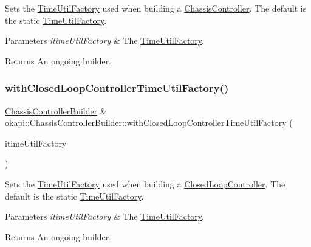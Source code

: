 Sets the \mbox{\hyperlink{classokapi_1_1TimeUtilFactory}{Time\+Util\+Factory}} used when building a \mbox{\hyperlink{classokapi_1_1ChassisController}{Chassis\+Controller}}. The default is the static \mbox{\hyperlink{classokapi_1_1TimeUtilFactory}{Time\+Util\+Factory}}.


\begin{DoxyParams}{Parameters}
{\em itime\+Util\+Factory} & The \mbox{\hyperlink{classokapi_1_1TimeUtilFactory}{Time\+Util\+Factory}}. \\
\hline
\end{DoxyParams}
\begin{DoxyReturn}{Returns}
An ongoing builder. 
\end{DoxyReturn}
\mbox{\label{classokapi_1_1ChassisControllerBuilder_a5bf13424f9357099d6e4d336cc0cec98}} 
\subsubsection{\texorpdfstring{withClosedLoopControllerTimeUtilFactory()}{withClosedLoopControllerTimeUtilFactory()}}
{\footnotesize\ttfamily \mbox{\hyperlink{classokapi_1_1ChassisControllerBuilder}{Chassis\+Controller\+Builder}} \& okapi\+::\+Chassis\+Controller\+Builder\+::with\+Closed\+Loop\+Controller\+Time\+Util\+Factory (\begin{DoxyParamCaption}\item[{const \mbox{\hyperlink{classokapi_1_1TimeUtilFactory}{Time\+Util\+Factory}} \&}]{itime\+Util\+Factory }\end{DoxyParamCaption})}

Sets the \mbox{\hyperlink{classokapi_1_1TimeUtilFactory}{Time\+Util\+Factory}} used when building a \mbox{\hyperlink{classokapi_1_1ClosedLoopController}{Closed\+Loop\+Controller}}. The default is the static \mbox{\hyperlink{classokapi_1_1TimeUtilFactory}{Time\+Util\+Factory}}.


\begin{DoxyParams}{Parameters}
{\em itime\+Util\+Factory} & The \mbox{\hyperlink{classokapi_1_1TimeUtilFactory}{Time\+Util\+Factory}}. \\
\hline
\end{DoxyParams}
\begin{DoxyReturn}{Returns}
An ongoing builder. 
\end{DoxyReturn}
\mbox{\label{classokapi_1_1ChassisControllerBuilder_a4d65988fd98e4530dfa236fce6d4d99a}} 
